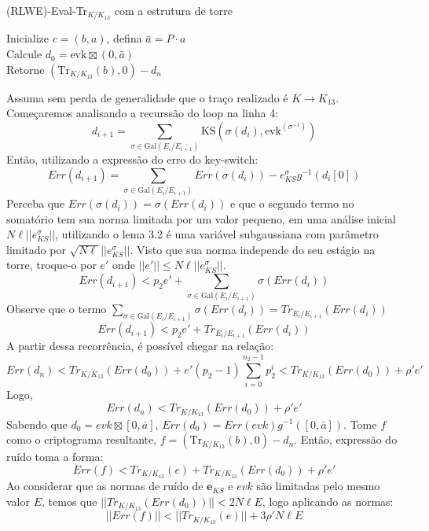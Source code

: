 \begin{algorithm}[H]
\caption{(RLWE)-Eval-Tr\(_{K/K_{13}}\) com a estrutura de torre}


Inicialize \(c = (b, a)\), defina \(\bar{a} = P \cdot a\) \\
Calcule \(d_0 = \text{evk} \boxtimes (0, \bar{a})\) \\
Retorne \((\text{Tr}_{K/K_{13}}(b), 0) - d_n\) 

\end{algorithm}
Assuma sem perda de generalidade que o traço realizado é $K \rightarrow K_{13}$.
Começaremos analisando a recurssão do loop na linha 4:
$$
d_{i+1} = \sum_{\sigma \in \text{Gal}(E_i/E_{i+1})} \text{KS}( \sigma(d_i), \text{evk}^{(\sigma^{-1})})
$$
Então, utilizando a expressão do erro do key-switch:
$$
Err(d_{i+1}) = \sum_{\sigma \in \text{Gal}(E_i/E_{i+1})} Err(\sigma(d_i)) - e_{KS}^{\sigma} g^{-1}(d_i[0])
$$
Perceba que $Err(\sigma(d_i)) = \sigma(Err(d_i))$ e que o segundo termo no somatório tem sua norma limitada por um valor pequeno,
em uma análise inicial $N\ell ||e_{KS}^{\sigma}||$, utilizando o lema 3.2 é uma variável subgaussiana com parâmetro limitado por 
$\sqrt{N\ell} ||e_{KS}^{\sigma}||$. Visto que sua norma independe do seu estágio na torre, troque-o por $e'$ onde $||e'|| \le  N\ell ||e_{KS}^{\sigma}||$.
$$
Err(d_{i+1}) < p_2 e'+ \sum_{\sigma \in \text{Gal}(E_i/E_{i+1})} \sigma(Err(d_i))
$$
Observe que o termo $\sum_{\sigma \in \text{Gal}(E_i/E_{i+1})} \sigma(Err(d_i)) = Tr_{E_i / E_{i+1}}(Err(d_i))$ 
$$
Err(d_{i+1}) < p_2 e' + Tr_{E_i/E_{i+1}}(Err(d_i))
$$
A partir dessa recorrência, é possível chegar na relação:
$$
Err(d_{n}) < Tr_{K/K_{13}}(Err(d_0)) + e' (p_2-1) \sum_{i=0}^{n_2-1} p_2^i < Tr_{K / K_{13}}(Err(d_0)) + \rho' e'
$$
Logo,
$$
Err(d_{n}) < Tr_{K / K_{13}}(Err(d_0)) + \rho' e'
$$
Sabendo que $d_0 = evk \boxtimes [0, \bar{a}]$, $Err(d_0) = Err(evk) g^{-1}([0, \bar{a}])$.
Tome $f$ como o criptograma resultante, $f = (\text{Tr}_{K/K_{13}}(b), 0) - d_n$. Então, expressão  do ruído toma a forma:
$$
Err(f) < Tr_{K / K_{13}}(e) + Tr_{K /K_{13}}(Err(d_0)) + \rho' e'
$$
Ao considerar que as normas de ruído de $\mathbf{e}_{KS}$ e $evk$ são limitadas pelo mesmo valor $E$, temos que $||Tr_{K /K_{13}}(Err(d_0))|| < 2N \ell E$, logo
aplicando as normas:
$$
||Err(f)|| < ||Tr_{K /K_{13}}(e)|| +  3 \rho'N\ell E
$$

